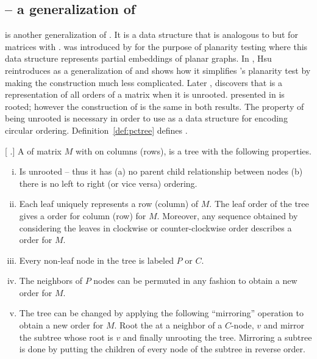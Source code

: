     
\subsection{\PCtree -- a generalization of \PQtree}

\PCtree is another generalization of \PQtree. It is a data structure that is
analogous to \PQtree but for matrices with \crop. \PCtree was
introduced by \cite{sh99} for the purpose of planarity testing where
this data structure represents partial embeddings of planar
graphs. %
In \cite{wlh01}, Hsu reintroduces \PCtree as a generalization of
\PQtree and shows how it simplifies \cite{bl76}'s planarity test by
making the \PQtree construction much less complicated. Later
\cite{hm03}, discovers that \PCtree is a representation of all \crop
orders of a matrix when it is unrooted. \PCtree presented in
\cite{wlh01} is rooted; however the construction of \PCtree is the
same in both results. The property of being unrooted is necessary in
order to use \PCtree as a data structure for encoding circular
ordering. Definition~\ref{def:pctree} defines \PCtree.

\begin{definition}
  \label{def:pctree}
  [\emph{\PCtree} \cite{wlh01,d08phd}.]  A \PCtree of matrix $M$ with
  \CROP on columns (rows), is a tree with the following properties.
  \begin{enumerate}[i.]
    \singlespacing
  \item Is unrooted -- thus it has (a) no parent child relationship
    between nodes (b) there is no left to right (or vice versa)
    ordering.
  \item Each leaf uniquely represents a row (column) of $M$. The leaf
    order of the tree gives a \CROP order for column (row) for
    $M$. Moreover, any sequence obtained by considering the leaves in
    clockwise or counter-clockwise order describes a \CROP order for
    $M$.
  \item Every non-leaf node in the tree is labeled $P$ or $C$.
  \item The neighbors of $P$ nodes can be permuted in any fashion to
    obtain a new \CROP order for $M$.
  \item \label{def::pcmirror} The tree can be changed by applying the following
    ``mirroring'' operation to obtain a new \CROP order for $M$. Root
    the \PCtree at a neighbor of a $C$-node, $v$ and mirror the
    subtree whose root is $v$ and finally unrooting the
    tree. Mirroring a subtree is done by putting the children of every
    node of the subtree in reverse order.
  \end{enumerate}
\end{definition}

